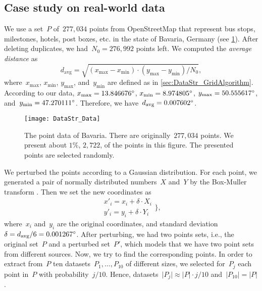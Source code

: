\subsection{Case study on real-world data}
\label{sec:DataStr_CaseStudy_RealData} 
We use a set~$P$ of~$277{,}034$ points 
from OpenStreetMap that represent 
bus stops, milestones, hotels, post boxes, etc. 
in the state of Bavaria, Germany 
(see \fig\ref{fig:DataStr_RealData}). 
After deleting duplicates, 
we had~$N_0=276{,}992$ points left. 
We computed the \emph{average distance} as
$$
d_\mathrm{avg}=\sqrt{(x_\mathrm{max}-x_\mathrm{min})\cdot 
(y_\mathrm{max}-y_\mathrm{min})/N_0},
$$
where~$x_\mathrm{max}$, $x_\mathrm{min}$, $y_\mathrm{max}$, 
and~$y_\mathrm{min}$ are defined as in 
\sect\ref{sec:DataStr_GridAlgorithm}.
According to our data, 
$x_\mathrm{max}=13.846676 \degree$, 
$x_\mathrm{min}=8.974805 \degree$, 
$y_\mathrm{max}=50.555617 \degree$,
and~$y_\mathrm{min}=47.270111 \degree$.
Therefore, we have~$d_\mathrm{avg}=0.007602 \degree$.


\begin{figure}[tb]
\centering
\texttt{[image: DataStr\_Data]}
\caption{The point data of Bavaria. 
	There are originally~$277{,}034$ points.
	We present about $1\%$, $2{,}722$, 
	of the points in this figure.
	The presented points are selected randomly.
}
\label{fig:DataStr_RealData}
\end{figure}

We perturbed the points 
according to a Gaussian distribution. 
For each point, we generated 
a pair of normally distributed numbers~$X$ and~$Y$ 
by the Box-Muller transform
\parencite[see][]{BoxMuller1958}. 
Then we set the new coordinates as
\begin{equation}
\begin{array}{l}
x'_i=x_i+\delta \cdot X_i  \\ 
y'_i=y_i+\delta \cdot Y_i
\end{array}
\bigg\}, \nonumber
\end{equation}
where~$x_i$ and~$y_i$ are the original coordinates, 
and standard deviation~$\delta =
d_\mathrm{avg}/6=0.001267 \degree$. 
After perturbing, we had two points sets, 
i.e., the original set~$P$ and a perturbed set~$P'$, 
which models that 
we have two point sets from different sources.
Now, we try to find the corresponding points. 
In order to extract from~$P$ 
ten datasets~$P_{1},\ldots,P_{10}$ of different sizes, 
we selected for~$P_{j}$ each point in~$P$ 
with probability~$j/10$. 
Hence, datasets~$\vert P_{j}\vert \approx 
\vert P\vert \cdot j/10$ 
and~$\vert P_{10}\vert =\vert P\vert$.


